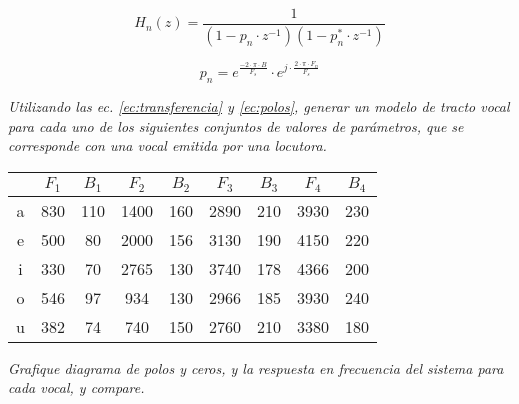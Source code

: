
	\begin{equation}
		H_n(z)=\frac{1}{(1-p_n \cdot z^{-1})(1-p_n^* \cdot z^{-1})}
		\label{ec:transferencia}
	\end{equation}

	\begin{equation}
		p_n=e^{\frac{-2 \cdot \pi \cdot B}{F_s}} \cdot e^{j \cdot \frac{2 \cdot \pi \cdot F_n}{F_s}}
		\label{ec:polos}
	\end{equation}


\textit{Utilizando las ec. \ref{ec:transferencia} y \ref{ec:polos}, generar un modelo de tracto vocal para cada uno de los siguientes
conjuntos de valores de parámetros, que se corresponde con una vocal emitida por una locutora.}
\begin{table}[h!]
	\centering
	\begin{tabular}{*{9}{c}}
\toprule
	 	&$F_1$	&$B_1$	&$F_2$	&$B_2$	&$F_3$	&$B_3$	&$F_4$	&$B_4$	\\
\midrule
	a	&830	&110	&1400	&160	&2890	&210	&3930	&230	\\
	e	&500	&80	&2000	&156	&3130	&190	&4150	&220	\\
	i	&330	&70	&2765	&130	&3740	&178	&4366	&200	\\
	o	&546	&97	&934	&130	&2966	&185	&3930	&240	\\
	u	&382	&74	&740	&150	&2760	&210	&3380	&180	\\
\bottomrule
	\end{tabular}
\end{table}
\textit{Grafique diagrama de polos y ceros, y la respuesta en frecuencia del sistema para cada vocal, y
compare.}


